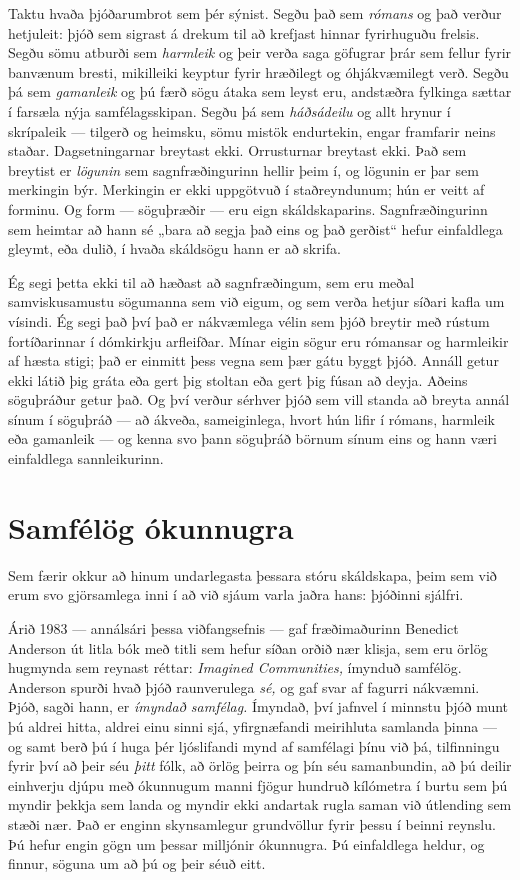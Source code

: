 Taktu hvaða þjóðarumbrot sem þér sýnist. Segðu það sem \emph{rómans} og það verður hetjuleit: þjóð sem sigrast á drekum til að krefjast hinnar fyrirhuguðu frelsis. Segðu sömu atburði sem \emph{harmleik} og þeir verða saga göfugrar þrár sem fellur fyrir banvænum bresti, mikilleiki keyptur fyrir hræðilegt og óhjákvæmilegt verð. Segðu þá sem \emph{gamanleik} og þú færð sögu átaka sem leyst eru, andstæðra fylkinga sættar í farsæla nýja samfélagsskipan. Segðu þá sem \emph{háðsádeilu} og allt hrynur í skrípaleik — tilgerð og heimsku, sömu mistök endurtekin, engar framfarir neins staðar. Dagsetningarnar breytast ekki. Orrusturnar breytast ekki. Það sem breytist er \emph{lögunin} sem sagnfræðingurinn hellir þeim í, og lögunin er þar sem merkingin býr. Merkingin er ekki uppgötvuð í staðreyndunum; hún er veitt af forminu. Og form — söguþræðir — eru eign skáldskaparins. Sagnfræðingurinn sem heimtar að hann sé „bara að segja það eins og það gerðist“ hefur einfaldlega gleymt, eða dulið, í hvaða skáldsögu hann er að skrifa.

Ég segi þetta ekki til að hæðast að sagnfræðingum, sem eru meðal samviskusamustu sögumanna sem við eigum, og sem verða hetjur síðari kafla um vísindi. Ég segi það því það er nákvæmlega vélin sem þjóð breytir með rústum fortíðarinnar í dómkirkju arfleifðar. Mínar eigin sögur eru rómansar og harmleikir af hæsta stigi; það er einmitt þess vegna sem þær gátu byggt þjóð. Annáll getur ekki látið þig gráta eða gert þig stoltan eða gert þig fúsan að deyja. Aðeins söguþráður getur það. Og því verður sérhver þjóð sem vill standa að breyta annál sínum í söguþráð — að ákveða, sameiginlega, hvort hún lifir í rómans, harmleik eða gamanleik — og kenna svo þann söguþráð börnum sínum eins og hann væri einfaldlega sannleikurinn.

\section*{Samfélög ókunnugra}

Sem færir okkur að hinum undarlegasta þessara stóru skáldskapa, þeim sem við erum svo gjörsamlega inni í að við sjáum varla jaðra hans: þjóðinni sjálfri.

Árið 1983 — annálsári þessa viðfangsefnis — gaf fræðimaðurinn Benedict Anderson út litla bók með titli sem hefur síðan orðið nær klisja, sem eru örlög hugmynda sem reynast réttar: \emph{Imagined Communities,} ímynduð samfélög. Anderson spurði hvað þjóð raunverulega \emph{sé,} og gaf svar af fagurri nákvæmni. Þjóð, sagði hann, er \emph{ímyndað samfélag.} Ímyndað, því jafnvel í minnstu þjóð munt þú aldrei hitta, aldrei einu sinni sjá, yfirgnæfandi meirihluta samlanda þinna — og samt berð þú í huga þér ljóslifandi mynd af samfélagi þínu við þá, tilfinningu fyrir því að þeir séu \emph{þitt} fólk, að örlög þeirra og þín séu samanbundin, að þú deilir einhverju djúpu með ókunnugum manni fjögur hundruð kílómetra í burtu sem þú myndir þekkja sem landa og myndir ekki andartak rugla saman við útlending sem stæði nær. Það er enginn skynsamlegur grundvöllur fyrir þessu í beinni reynslu. Þú hefur engin gögn um þessar milljónir ókunnugra. Þú einfaldlega heldur, og finnur, söguna um að þú og þeir séuð eitt.

